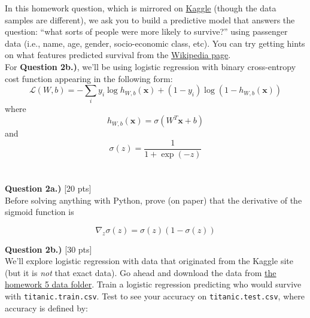 \documentclass[paper=a4, fontsize=11pt]{scrartcl} %
\begin{document}
In this homework question, which is mirrored on \href{https://www.kaggle.com/competitions/titanic/overview}{Kaggle} (though the data samples are different), we ask you to build a predictive model that answers the question: “what sorts of people were more likely to survive?” using passenger data (i.e., name, age, gender, socio-economic class, etc). You can try getting hints on what features predicted survival from the \href{https://en.wikipedia.org/wiki/Sinking_of_the_Titanic#Casualties_and_survivors}{Wikipedia page}. \\

For \textbf{Question 2b.)}, we'll be using logistic regression with binary cross-entropy cost function appearing in the following form: \\

\begin{equation}
    \mathcal{L}(W, b) = -\sum_i y_i \log{ h_{W,b}(\textbf{x}) } + (1 - y_i) \log{( 1 - h_{W,b}(\textbf{x})) } \nonumber
\end{equation}
where 
\begin{equation}
h_{W,b}(\textbf{x}) = \sigma \left( W^T\textbf{x} + b \right) \nonumber
\end{equation}
and
\begin{equation}
\sigma(z) = \frac{1}{1 + \exp(-z)} \nonumber
\end{equation} \\
\\

\vspace{1cm}
{\Large \textbf{Question 2a.)} [20 pts]} \\

Before solving anything with Python, prove (on paper) that the derivative of the sigmoid function is 

\begin{equation}
    \nabla_z \sigma(z) = \sigma(z) \left(1 - \sigma(z)\right) \nonumber
\end{equation}

\vspace{1cm}
{\Large \textbf{Question 2b.)} [30 pts]} \\

We'll explore logistic regression with data that originated from the Kaggle site (but it is \emph{not} that exact data). Go ahead and download the data from \href{https://course.ccs.neu.edu/cs6220/homework-5/data/titanic/}{the homework 5 data folder}. Train a logistic regression predicting who would survive with \verb"titanic.train.csv". Test to see your accuracy on \verb"titanic.test.csv", where accuracy is defined by:
\end{document}

